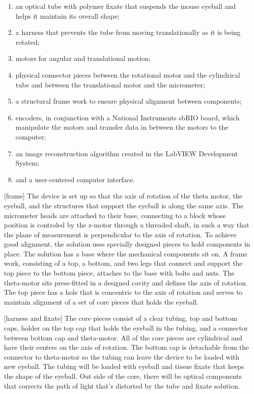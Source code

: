 \documentclass{article}
\begin{document}
\begin{enumerate}
 \item an optical tube with polymer fixate that suspends the mouse eyeball and helps it maintain its overall shape; 
\item a harness that prevents the tube from moving translationally as it is being rotated;
\item motors for angular and translational motion; 
\item physical connector pieces between the rotational motor and the cylindrical tube and between the translational motor and the micrometer;
\item a structural frame work to ensure physical alignment between components; 
\item encoders, in conjunction with a National Instruments sbRIO board, which manipulate the motors and transfer data in between the motors to the computer;  
\item an image reconstruction algorithm created in the LabVIEW Development System;
\item and a user-centered computer interface. 
\end{enumerate}


[frame]
	The device is set up so that the axis of rotation of the theta motor, the eyeball, and the structures 
that support the eyeball is along the same axis. The micrometer heads are attached to their base, 
connecting to a block whose position is controled by the z-motor through a threaded shaft, in such a way 
that the plane of measurement is perpendicular to the axis of rotation. To achieve good alignment, the 
solution uses specially designed pieces to hold components in place. The solution has a base where the 
mechanical components sit on. A frame work, consisting of a top, a bottom, and two legs that connect and 
support the top piece to the bottom piece, attaches to the base with bolts and nuts. The theta-motor sits 
press-fitted in a designed cavity and defines the axis of rotation. The top piece has a hole that is concentric 
to the axis of rotation and serves to maintain alignment of a set of core pieces that holds the eyeball. 

[harness and fixate]
	The core pieces consist of a clear tubing, top and bottom caps, holder on the top cap that holds 
the eyeball in the tubing, and a connector between bottom cap and theta-motor. All of the core pieces are 
cylindrical and have their centers on the axis of rotation. The bottom cap is detachable from the connector 
to theta-motor so the tubing can leave the device to be loaded with new eyeball. The tubing will be loaded 
with eyeball and tissue fixate that keeps the shape of the eyeball. Out side of the core, there will be optical 
components that corrects the path of light that's distorted by the tube and fixate solution.
\end{document}
